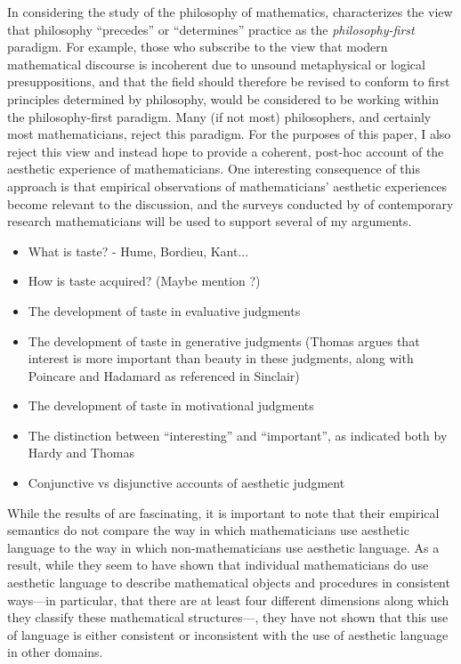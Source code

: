 \documentclass[a4paper,man,natbib]{apa6}
\begin{document}
In considering the study of the philosophy of mathematics, \cite{shapiro_thinking_2000} characterizes
the view that philosophy ``precedes'' or ``determines'' practice as the \textit{philosophy-first} paradigm.
For example, those who subscribe to the view that modern mathematical discourse is incoherent due to unsound
metaphysical or logical presuppositions, and that the field should therefore be revised to conform to
first principles determined by philosophy, would be considered to be working within the philosophy-first
paradigm. Many (if not most) philosophers, and certainly most mathematicians, reject this paradigm. For the
purposes of this paper, I also reject this view and instead hope to provide a coherent, post-hoc account
of the aesthetic experience of mathematicians. One interesting consequence of this approach is that empirical
observations of mathematicians' aesthetic experiences become relevant to the discussion, and the surveys
conducted by \cite{inglis_beauty_2015} of contemporary research mathematicians will be used to support several
of my arguments. 

\begin{itemize}
      \item What is taste? - Hume, Bordieu, Kant...
      \item How is taste acquired? (Maybe mention \cite{mcallister_mathematical_2005}?)
      \item The development of taste in evaluative judgments
      \item The development of taste in generative judgments (Thomas argues that 
      interest is more important than beauty in these judgments, along with 
      Poincare and Hadamard as referenced in Sinclair)
      \item The development of taste in motivational judgments
      \item The distinction between ``interesting'' and ``important'', as indicated
      both by Hardy and Thomas
      \item Conjunctive vs disjunctive accounts of aesthetic judgment
\end{itemize}





While the results of \cite{inglis_beauty_2015} are fascinating, it is important to note that their empirical
semantics do not compare the way in which mathematicians use aesthetic language to the way in which non-mathematicians
use aesthetic language. As a result, while they seem to have shown that individual mathematicians do use aesthetic
language to describe mathematical objects and procedures in consistent ways---in particular, that there are
at least four different dimensions along which they classify these mathematical structures---, they have not shown that this use
of language is either consistent or inconsistent with the use of aesthetic language in other domains. 
\end{document}
